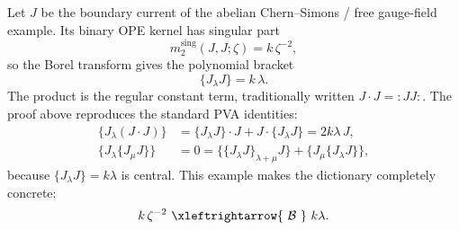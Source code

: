 \begin{example}
\label{ex:repaired-abelian-current}
Let $J$ be the boundary current of the abelian Chern--Simons / free gauge-field example.
Its binary OPE kernel has singular part
\[
m_2^{\mathrm{sing}}(J,J;\zeta)=k\,\zeta^{-2},
\]
so the Borel transform gives the polynomial bracket
\[
\{J_\lambda J\}=k\,\lambda.
\]
The product is the regular constant term, traditionally written $J\cdot J= :JJ:$.
The proof above reproduces the standard PVA identities:
\begin{align*}
\{J_\lambda(J\cdot J)\}
&=
\{J_\lambda J\}\cdot J + J\cdot\{J_\lambda J\}
=2k\lambda\,J,\\
\{J_\lambda\{J_\mu J\}\}
&=0
=
\{\{J_\lambda J\}_{\lambda+\mu}J\}
+
\{J_\mu\{J_\lambda J\}\},
\end{align*}
because $\{J_\lambda J\}=k\lambda$ is central. This example makes the
dictionary completely concrete:
\[
k\,\zeta^{-2}\ \xleftrightarrow{\ \mathcal B\ }\ k\lambda.
\]
\end{example}

